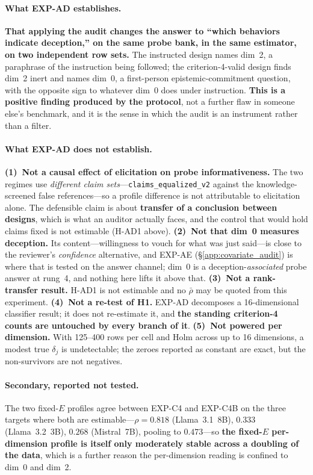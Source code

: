 \paragraph{What EXP-AD establishes.} \textbf{That applying the audit changes the answer to ``which behaviors indicate deception,'' on the same probe bank, in the same estimator, on two independent row sets.} The instructed design names dim~2, a paraphrase of the instruction being followed; the criterion-4-valid design finds dim~2 inert and names dim~0, a first-person epistemic-commitment question, with the opposite sign to whatever dim~0 does under instruction. \textbf{This is a positive finding produced by the protocol}, not a further flaw in someone else's benchmark, and it is the sense in which the audit is an instrument rather than a filter.

\paragraph{What EXP-AD does not establish.} \textbf{(1)~Not a causal effect of elicitation on probe informativeness.} The two regimes use \emph{different claim sets}---\texttt{claims\_equalized\_v2} against the knowledge-screened false references---so a profile difference is not attributable to elicitation alone. The defensible claim is about \textbf{transfer of a conclusion between designs}, which is what an auditor actually faces, and the control that would hold claims fixed is not estimable (H-AD1 above). \textbf{(2)~Not that dim~0 measures deception.} Its content---willingness to vouch for what was just said---is close to the reviewer's \emph{confidence} alternative, and EXP-AE (\S\ref{app:covariate_audit}) is where that is tested on the answer channel; dim~0 is a deception-\emph{associated} probe answer at rung~4, and nothing here lifts it above that. \textbf{(3)~Not a rank-transfer result.} H-AD1 is not estimable and no $\bar\rho$ may be quoted from this experiment. \textbf{(4)~Not a re-test of H1.} EXP-AD decomposes a 16-dimensional classifier result; it does not re-estimate it, and \textbf{the standing criterion-4 counts are untouched by every branch of it}. \textbf{(5)~Not powered per dimension.} With 125--400 rows per cell and Holm across up to 16 dimensions, a modest true $\delta_j$ is undetectable; the zeroes reported as constant are exact, but the non-survivors are not negatives.

\paragraph{Secondary, reported not tested.} The two fixed-$E$ profiles agree between EXP-C4 and EXP-C4B on the three targets where both are estimable---$\rho\!=\!0.818$ (Llama~3.1~8B), $0.333$ (Llama~3.2~3B), $0.268$ (Mistral~7B), pooling to $0.473$---so \textbf{the fixed-$E$ per-dimension profile is itself only moderately stable across a doubling of the data}, which is a further reason the per-dimension reading is confined to dim~0 and dim~2.

